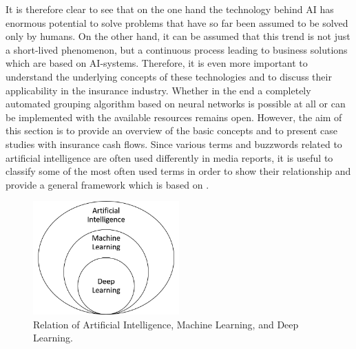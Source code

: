 It is therefore clear to see that on the one hand the technology behind AI has enormous potential to solve problems that have so far been assumed to be solved only by humans. On the other hand, it can be assumed that this trend is not just a short-lived phenomenon, but a continuous process leading to business solutions which are based on AI-systems. Therefore, it is even more important to understand the underlying concepts of these technologies and to discuss their applicability in the insurance industry. Whether in the end a completely automated grouping algorithm based on neural networks is possible at all or can be implemented with the available resources remains open. However, the aim of this section is to provide an overview of the basic concepts and to present case studies with insurance cash flows. Since various terms and buzzwords related to artificial intelligence are often used differently in media reports, it is useful to classify some of the most often used terms in order to show their relationship and provide a general framework which is based on \cite{Allaire2018}. 

\begin{figure}
	\centering
	\includegraphics[width=0.5\textwidth]{figures/chapter_NN/framework}
	\caption{Relation of Artificial Intelligence, Machine Learning, and Deep Learning.}
	\label{fig:framework}
\end{figure}

